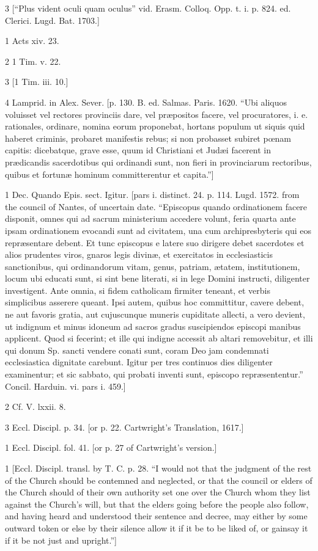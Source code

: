 3
[“Plus vident oculi quam oculus” vid. Erasm. Colloq. Opp. t. i. p. 824. ed. Clerici. Lugd. Bat. 1703.]

1
Acts xiv. 23.

2
1 Tim. v. 22.

3
[1 Tim. iii. 10.]

4
Lamprid. in Alex. Sever. [p. 130. B. ed. Salmas. Paris. 1620. “Ubi aliquos voluisset vel rectores provinciis dare, vel præpositos facere, vel procuratores, i. e. rationales, ordinare, nomina eorum proponebat, hortans populum ut siquis quid haberet criminis, probaret manifestis rebus; si non probasset subiret pœnam capitis: dicebatque, grave esse, quum id Christiani et Judæi facerent in prædicandis sacerdotibus qui ordinandi sunt, non fieri in provinciarum rectoribus, quibus et fortunæ hominum committerentur et capita.”]

1
Dec. Quando Epis. sect. Igitur. [pars i. distinct. 24. p. 114. Lugd. 1572. from the council of Nantes, of uncertain date. “Episcopus quando ordinationem facere disponit, omnes qui ad sacrum ministerium accedere volunt, feria quarta ante ipsam ordinationem evocandi sunt ad civitatem, una cum archipresbyteris qui eos repræsentare debent. Et tunc episcopus e latere suo dirigere debet sacerdotes et alios prudentes viros, gnaros legis divinæ, et exercitatos in ecclesiasticis sanctionibus, qui ordinandorum vitam, genus, patriam, ætatem, institutionem, locum ubi educati sunt, si sint bene literati, si in lege Domini instructi, diligenter investigent. Ante omnia, si fidem catholicam firmiter teneant, et verbis simplicibus asserere queant. Ipsi autem, quibus hoc committitur, cavere debent, ne aut favoris gratia, aut cujuscunque muneris cupiditate allecti, a vero devient, ut indignum et minus idoneum ad sacros gradus suscipiendos episcopi manibus applicent. Quod si fecerint; et ille qui indigne accessit ab altari removebitur, et illi qui donum Sp. sancti vendere conati sunt, coram Deo jam condemnati ecclesiastica dignitate carebunt. Igitur per tres continuos dies diligenter examinentur; et sic sabbato, qui probati inventi sunt, episcopo repræsententur.” Concil. Harduin. vi. pars i. 459.]

2
Cf. V. lxxii. 8.

3
Eccl. Discipl. p. 34. [or p. 22. Cartwright’s Translation, 1617.]

1
Eccl. Discipl. fol. 41. [or p. 27 of Cartwright’s version.]

1
[Eccl. Discipl. transl. by T. C. p. 28. “I would not that the judgment of the rest of the Church should be contemned and neglected, or that the council or elders of the Church should of their own authority set one over the Church whom they list against the Church’s will, but that the elders going before the people also follow, and having heard and understood their sentence and decree, may either by some outward token or else by their silence allow it if it be to be liked of, or gainsay it if it be not just and upright.”]


